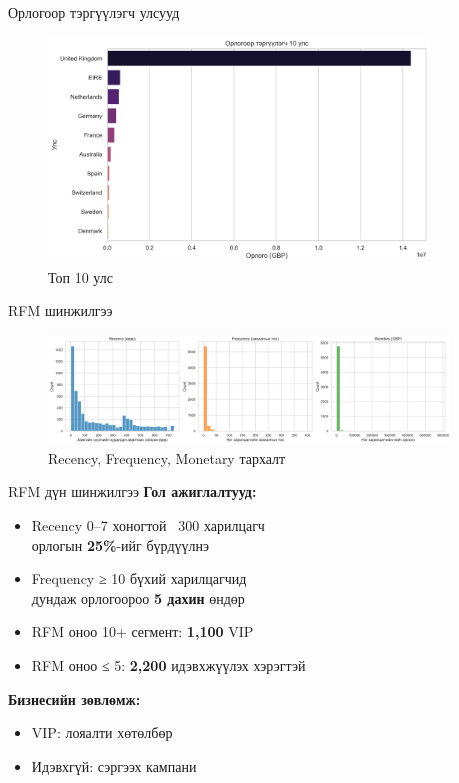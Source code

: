 \documentclass{beamer}
\begin{document}
\begin{frame}{Орлогоор тэргүүлэгч улсууд}
\begin{figure}
    \centering
    \includegraphics[width=0.9\textwidth]{top_countries_revenue.png}
    \caption{Топ 10 улс}
\end{figure}
\end{frame}

\begin{frame}{RFM шинжилгээ}
\begin{figure}
    \centering
    \includegraphics[width=0.95\textwidth]{rfm_distribution.png}
    \caption{Recency, Frequency, Monetary тархалт}
\end{figure}
\end{frame}

\begin{frame}{RFM дүн шинжилгээ}
\small
\textbf{Гол ажиглалтууд:}
\begin{itemize}
    \item Recency 0--7 хоногтой ~300 харилцагч\\орлогын \textbf{25\%}-ийг бүрдүүлнэ
    \item Frequency ≥ 10 бүхий харилцагчид\\дундаж орлогоороо \textbf{5 дахин} өндөр
    \item RFM оноо 10+ сегмент: \textbf{1,100} VIP
    \item RFM оноо ≤ 5: \textbf{2,200} идэвхжүүлэх хэрэгтэй
\end{itemize}

\vspace{0.2cm}
\textbf{Бизнесийн зөвлөмж:}
\begin{itemize}
    \item VIP: лояалти хөтөлбөр
    \item Идэвхгүй: сэргээх кампани
\end{itemize}
\end{frame}
\end{document}
